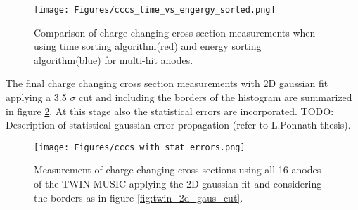 \begin{figure}[htpb]
    \centering
    \texttt{[image: Figures/cccs\_time\_vs\_engergy\_sorted.png]}
    \caption{
    Comparison of charge changing cross section measurements when using time sorting algorithm(red) and energy sorting algorithm(blue) for multi-hit anodes.
     }
    \label{fig:cccs_gaus_time_vs_energy}
\end{figure}
The final charge changing cross section measurements with 2D gaussian fit applying a 3.5 $\sigma$ cut and including the borders of the histogram are summarized in figure \ref{fig:cccs_gaus_with_errors}. At this stage also the statistical errors are incorporated. 
TODO: Description of statistical gaussian error propagation (refer to L.Ponnath thesis).
\begin{figure}[htpb]
    \centering
    \texttt{[image: Figures/cccs\_with\_stat\_errors.png]}
    \caption{
    Measurement of charge changing cross sections using all 16 anodes of the TWIN MUSIC applying the 2D gaussian fit and considering the borders as in figure \ref{fig:twin_2d_gaus_cut}.
     }
    \label{fig:cccs_gaus_with_errors}
\end{figure}


%	
